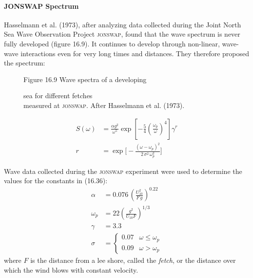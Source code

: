 \paragraph{JONSWAP Spectrum}Hasselmann et al. (1973), after analyzing data
collected during the Joint North Sea Wave
Observation Project \textsc{jonswap}, found that the wave spectrum is
never fully developed (figure 16.9). It continues to develop through
non-linear, wave-wave interactions even for very long times and
distances. They therefore proposed the spectrum:

\begin{figure}[t!]
\footnotesize
\centering
Figure 16.9 Wave spectra of a developing \rule{0mm}{3ex}sea for
different fetches\\measured at \textsc{jonswap}. After Hasselmann et al. (1973).

\label{fig:hasselmannspect}

\vspace{-3ex}
\end{figure}

\begin{subequations}
\begin{align}
S(\omega) &= \frac{\alpha g^{2}}{\omega ^{5}} \exp \left[ - \frac{5}{4}
\left(
\frac{\omega _{p}}{\omega } \right) ^{4} \right] \gamma ^{r} \\
r &= \exp \biggl[ - \frac{\left(\omega - \omega _{p}\right)^{2}}{2\, \sigma ^{2}
\,\omega _{p}^{2}}
\biggr]
\end{align}
\end{subequations}

Wave data collected during the \textsc{jonswap} experiment were used
to determine the values for the constants in (16.36):
\begin{subequations}
\begin{align}
\alpha &= 0.076 \, \left( \frac{U_{10}^{2}}{F \, g} \right)^{0.22} \\
\omega_p &= 22 \left(\frac{g^2}{U_{10}F}\right)^{1/3} \\
\gamma &= 3.3 \\
   \sigma &= \left\{ \begin{array}{ll}
                    0.07 & \omega \leq \omega _{p} \\
                    0.09 & \omega > \omega _{p}
                    \end{array}
            \right.
\end{align}
\end{subequations}
where $F$ is the distance from a lee shore, called the
\textit{fetch}, or the
distance over which the wind blows with constant velocity.

